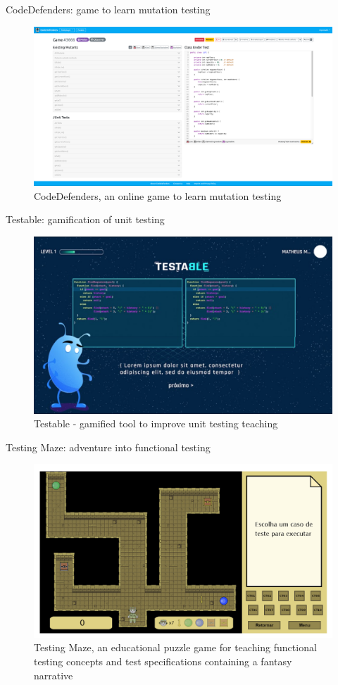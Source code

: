 \documentclass[aspectratio=169]{beamer}
\begin{document}
\begin{frame}{CodeDefenders: game to learn mutation testing}
\begin{figure}
    \centering
    \includegraphics[width=0.75\linewidth]{images//games/codedefenders.png}
    \caption{CodeDefenders, an online game to learn mutation testing}
\end{figure}
\end{frame}

\begin{frame}{Testable: gamification of unit testing}
\begin{figure}
    \centering
    \includegraphics[width=0.75\linewidth]{images//games/testable}
    \caption{Testable - gamified tool to improve unit testing teaching}
\end{figure}
\end{frame}

\begin{frame}{Testing Maze: adventure into functional testing}
\begin{figure}
    \centering
    \includegraphics[width=0.75\linewidth]{images//games/testingmaze}
    \caption{Testing Maze, an educational puzzle game for teaching functional testing concepts and test specifications containing a fantasy narrative}
\end{figure}
\end{frame}
\end{document}
